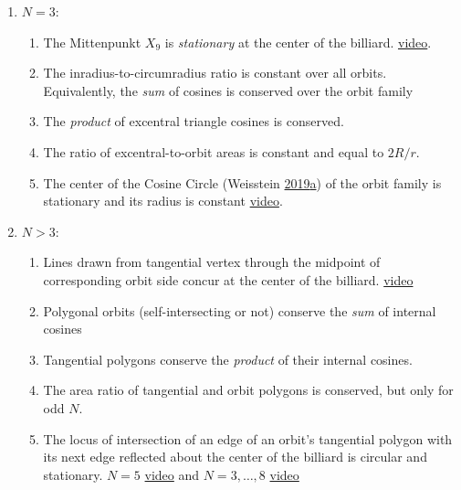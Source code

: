 \documentclass[]{article}
\providecommand{\tightlist}{%
  \setlength{\itemsep}{0pt}\setlength{\parskip}{0pt}}
\begin{document}
\begin{enumerate}
\def\labelenumi{\arabic{enumi}.}
\tightlist
\item
  \(N=3\):

  \begin{enumerate}
  \def\labelenumii{\arabic{enumii}.}
  \tightlist
  \item
    The Mittenpunkt \(X_{9}\) is \emph{stationary} at the center of the billiard. \href{https://youtu.be/AoCWcza95OA}{video}.
  \item
    The inradius-to-circumradius ratio is constant over all orbits. Equivalently, the \emph{sum} of cosines is conserved over the orbit family
  \item
    The \emph{product} of excentral triangle cosines is conserved.
  \item
    The ratio of excentral-to-orbit areas is constant and equal to \(2R/r\).
  \item
    The center of the Cosine Circle (Weisstein \protect\hyperlink{ref-mw}{2019}\protect\hyperlink{ref-mw}{a}) of the orbit family is stationary and its radius is constant \href{https://www.youtube.com/watch?v=hCQIT6_XhaQ}{video}.
  \end{enumerate}
\item
  \(N>3\):

  \begin{enumerate}
  \def\labelenumii{\arabic{enumii}.}
  \tightlist
  \item
    Lines drawn from tangential vertex through the midpoint of corresponding orbit side concur at the center of the billiard. \href{https://www.youtube.com/watch?v=4lj9yQ-e_cE}{video}
  \item
    Polygonal orbits (self-intersecting or not) conserve the \emph{sum} of internal cosines
  \item
    Tangential polygons conserve the \emph{product} of their internal cosines.
  \item
    The area ratio of tangential and orbit polygons is conserved, but only for odd \(N\).
  \item
    The locus of intersection of an edge of an orbit's tangential polygon with its next edge reflected about the center of the billiard is circular and stationary. \(N=5\) \href{https://www.youtube.com/watch?v=dINE4aH1cvk}{video} and \(N=3,\ldots,8\) \href{https://www.youtube.com/watch?v=EFeINGIDFrg}{video}
  \end{enumerate}
\end{enumerate}
\end{document}
